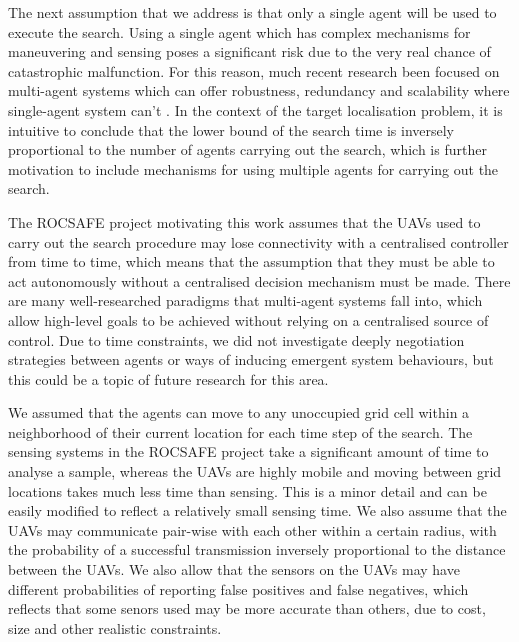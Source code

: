 The next assumption that we address is that only a single agent will be used to execute the search. Using a single agent which has complex mechanisms for maneuvering and sensing poses a significant risk due to the very real chance of catastrophic malfunction. For this reason, much recent research been focused on multi-agent systems which can offer robustness, redundancy and scalability where single-agent system can't \cite{Stone2000MultiagentPerspective}. In the context of the target localisation problem, it is intuitive to conclude that the lower bound of the search time is inversely proportional to the number of agents carrying out the search, which is further motivation to include mechanisms for using multiple agents for carrying out the search.

The ROCSAFE project \cite{rocsafeNUIG} motivating this work assumes that the UAVs used to carry out the search procedure may lose connectivity with a centralised controller from time to time, which means that the assumption that they must be able to act autonomously without a centralised decision mechanism must be made. There are many well-researched paradigms that multi-agent systems fall into, which allow high-level goals to be achieved without relying on a centralised source of control. Due to time constraints, we did not investigate deeply negotiation strategies between agents or ways of inducing emergent system behaviours, but this could be a topic of future research for this area.\par
We assumed that the agents can move to any unoccupied grid cell within a neighborhood of their current location for each time step of the search. The sensing systems in the ROCSAFE project take a significant amount of time to analyse a sample, whereas the UAVs are highly mobile and moving between grid locations takes much less time than sensing. This is a minor detail and can be easily modified to reflect a relatively small sensing time. We also assume that the UAVs may communicate pair-wise with each other within a certain radius, with the probability of a successful transmission inversely proportional to the distance between the UAVs. We also allow that the sensors on the UAVs may have different probabilities of reporting false positives and false negatives, which reflects that some senors used may be more accurate than others, due to cost, size and other realistic constraints. \par

